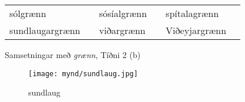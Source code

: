 \documentclass[../samsetningasafn.tex]{subfiles}
\begin{document}
\begin{wordlist}[H]
\begin{tcolorbox}

	\setlength{\extrarowheight}{3pt}
	\begin{tabular}{BlBlBl}		
		sólgrænn		&	\phantom{baa}	& 		
		sósíalgrænn		&	\phantom{baa}	& 		
		spítalagrænn		&	\phantom{baa}	\\ 	
		sundlaugargrænn	&		& 	
		viðargrænn		&		& 		
		Viðeyjargrænn	&			
	\end{tabular}

\end{tcolorbox}
	\caption{Samsetningar með \textit{grænn}, Tíðni 2 (b)}
	\label{listi:graent.2b}
\end{wordlist}

\begin{figure}[H]
\begin{tcolorbox}
\centering
	\texttt{[image: mynd/sundlaug.jpg]}
\end{tcolorbox}
	\caption{sundlaug}
	\label{mynd:sundlaug}
\end{figure}
\end{document}
